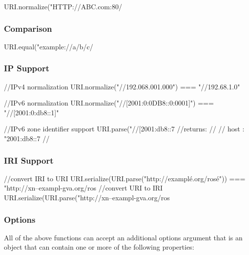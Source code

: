 \begin{DoxyVerb}URI.normalize("HTTP://ABC.com:80/%
\end{DoxyVerb}


\subsubsection*{Comparison}

\begin{DoxyVerb}URI.equal("example://a/b/c/%
\end{DoxyVerb}


\subsubsection*{IP Support}

\begin{DoxyVerb}//IPv4 normalization
URI.normalize("//192.068.001.000") === "//192.68.1.0"

//IPv6 normalization
URI.normalize("//[2001:0:0DB8::0:0001]") === "//[2001:0:db8::1]"

//IPv6 zone identifier support
URI.parse("//[2001:db8::7%
//returns:
//{
//  host : "2001:db8::7%
//}
\end{DoxyVerb}


\subsubsection*{I\+RI Support}

\begin{DoxyVerb}//convert IRI to URI
URI.serialize(URI.parse("http://examplé.org/rosé")) === "http://xn--exampl-gva.org/ros%
//convert URI to IRI
URI.serialize(URI.parse("http://xn--exampl-gva.org/ros%
\end{DoxyVerb}


\subsubsection*{Options}

All of the above functions can accept an additional options argument that is an object that can contain one or more of the following properties\+:


